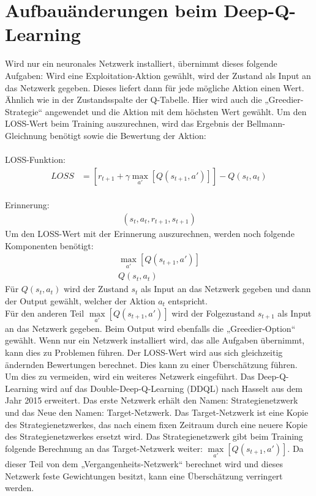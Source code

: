 \documentclass[12pt,titlepage]{article}
\begin{document}
\section{Aufbauänderungen beim Deep-Q-Learning}
Wird nur ein neuronales Netzwerk installiert, übernimmt dieses folgende Aufgaben: 
Wird eine Exploitation-Aktion gewählt, wird der Zustand als Input an das Netzwerk gegeben. Dieses liefert dann für jede mögliche Aktion einen Wert. Ähnlich wie in der Zustandsspalte der Q-Tabelle. Hier wird auch die „Greedier-Strategie“ angewendet und die Aktion mit dem höchsten Wert gewählt. Um den LOSS-Wert beim Training auszurechnen, wird das Ergebnis der Bellmann-Gleichnung benötigt sowie die Bewertung der Aktion:
\\\\
LOSS-Funktion:
\begin{align*}
LOSS &= \left[ r_{t+1} + \gamma \max\limits_{a'} \left[ Q(s_{t+1}, a') \right] \right] - Q(s_t,a_t)
\end{align*}
\\
Erinnerung:
\begin{align*}
(s_t,a_t,r_{t+1},s_{t+1})
\end{align*}
Um den LOSS-Wert mit der Erinnerung auszurechnen, werden noch folgende Komponenten benötigt:
\begin{align*}
\max\limits_{a'} \left[ Q(s_{t+1}, a') \right]\\
Q(s_t,a_t)
\end{align*}
Für $Q(s_t,a_t)$ wird der Zustand $s_t$ als Input an das Netzwerk gegeben und dann der Output gewählt, welcher der Aktion $a_t$ entspricht.\\ 
Für den anderen Teil $\max\limits_{a'} \left[ Q(s_{t+1}, a') \right]$ wird der Folgezustand $s_{t+1}$ als Input an das Netzwerk gegeben. Beim Output wird ebenfalls die „Greedier-Option“ gewählt.
Wenn nur ein Netzwerk installiert wird, das alle Aufgaben übernimmt, kann dies zu Problemen führen. Der LOSS-Wert wird aus sich gleichzeitig ändernden Bewertungen berechnet. Dies kann zu einer Überschätzung führen. 
Um dies zu vermeiden, wird ein weiteres Netzwerk eingeführt. Das Deep-Q-Learning wird auf das Double-Deep-Q-Learning (DDQL) nach Hasselt aus dem Jahr 2015 erweitert. Das erste Netzwerk erhält den Namen: Strategienetzwerk und das Neue den Namen: Target-Netzwerk. Das Target-Netzwerk ist eine Kopie des Strategienetzwerkes, das nach einem fixen Zeitraum durch eine neuere Kopie des Strategienetzwerkes ersetzt wird. Das Strategienetzwerk gibt beim Training folgende Berechnung an das Target-Netzwerk weiter: $\max\limits_{a'} \left[ Q(s_{t+1}, a') \right]$. Da dieser Teil von dem „Vergangenheits-Netzwerk“ berechnet wird und dieses Netzwerk feste Gewichtungen besitzt, kann eine Überschätzung verringert werden.
\end{document}
